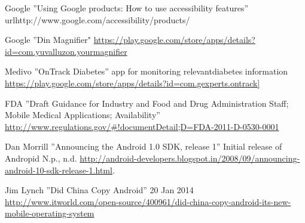 \documentclass[conference]{IEEEtran}
\begin{document}
\begin{thebibliography}{1}
Google ''Using Google products: How to use accessibility features'' url{http://www.google.com/accessibility/products/}

Google ''Din Magnifier" \url{https://play.google.com/store/apps/details?id=com.yuvalluzon.yourmagnifier}

Medivo ''OnTrack Diabetes'' app for monitoring relevantdiabetes information
\url{https://play.google.com/store/apps/details?id=com.gexperts.ontrack]}

FDA ''Draft Guidance for Industry and Food and Drug Administration Staff; Mobile Medical Applications; Availability''
\url{http://www.regulations.gov/#!documentDetail;D=FDA-2011-D-0530-0001}





Dan Morrill ''Announcing the Android 1.0 SDK, release 1'' Initial release of Andropid N.p., n.d. \url{http://android-developers.blogspot.in/2008/09/announcing-android-10-sdk-release-1.html}.

Jim Lynch ''Did China Copy Android''  20 Jan 2014 \url{http://www.itworld.com/open-source/400961/did-china-copy-android-its-new-mobile-operating-system} 

\end{thebibliography}
\end{document}
